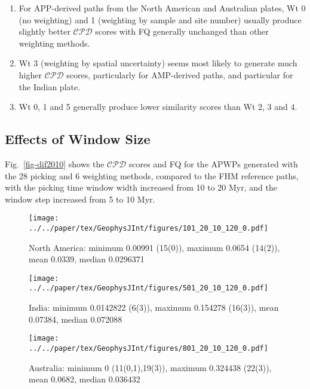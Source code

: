 %
\begin{enumerate}
  \item For APP-derived paths from the North American and Australian plates, Wt
    0 (no weighting) and 1 (weighting by sample and site number) usually produce
    slightly better $\mathcal{CPD}$ scores with FQ generally unchanged than
    other weighting methods.
  \item Wt 3 (weighting by spatial uncertainty) seems most likely to generate
    much higher $\mathcal{CPD}$ scores, particularly for AMP-derived paths, and
    particular for the Indian plate.
  \item Wt 0, 1 and 5 generally produce lower similarity scores than Wt 2, 3 and
    4.
\end{enumerate}

\subsection{Effects of Window Size}\label{sec:winsiz}

Fig.~\ref{fig-dif2010} shows the $\mathcal{CPD}$ scores and FQ for the APWPs
generated with the 28 picking and 6 weighting methods, compared to the FHM
reference paths, with the picking time window width increased from 10 to 20 Myr,
and the window step increased from 5 to 10 Myr.

\begin{figure*}
  \centering
  \begin{subfigure}{.96\textwidth}
    \texttt{[image: ../../paper/tex/GeophysJInt/figures/101\_20\_10\_120\_0.pdf]}
    \caption{North America: minimum 0.00991 (15(0)), maximum 0.0654 (14(2)),
      mean 0.0339, median 0.0296371}\label{fig-na-dif2010}
  \end{subfigure}
  \vspace{.1em}
  \begin{subfigure}{.96\textwidth}
    \texttt{[image: ../../paper/tex/GeophysJInt/figures/501\_20\_10\_120\_0.pdf]}
    \caption{India: minimum 0.0142822 (6(3)), maximum 0.154278 (16(3)), mean
      0.07384, median 0.072088}\label{fig-in-dif2010}
  \end{subfigure}
  \vspace{.1em}
  \begin{subfigure}{.96\textwidth}
    \texttt{[image: ../../paper/tex/GeophysJInt/figures/801\_20\_10\_120\_0.pdf]}
    \caption{Australia: minimum 0 (11(0,1),19(3)), maximum 0.324438 (22(3)),
      mean 0.0682, median 0.036432}\label{fig-au-dif2010}
  \end{subfigure}
  \caption[$\mathcal{CPD}$ of each plate's paleomagnetic APWPs vs its FHM
    predicted APWP (20/10 Myr window/step)]{As Fig.~\ref{fig-dif}, here the
    paths are generated in 20/10 Myr bin/step. The difference values less than
    one-standard-deviation interval of the whole 168 values are colored in
    green, more than one-standard-deviation interval colored in red. Compare the
    numbers of picked paleopoles with those in
    Fig.~\ref{fig-dif}.}\label{fig-dif2010}
\end{figure*}

